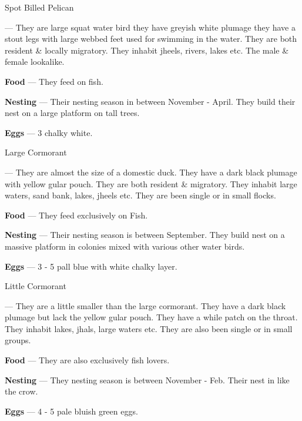 \begin{bird}{Spot Billed Pelican}

 --- They are large squat water bird they have greyish white plumage they have a stout legs with large webbed feet used for swimming in the water. They are both resident \& locally migratory. They inhabit jheels, rivers, lakes etc. The male \& female lookalike. 

{\large\bf Food} --- They feed on fish.

{\large\bf Nesting} --- Their nesting season in between November - April. They build their nest on a large platform on tall trees.

{\large\bf Eggs} --- 3 chalky white.
\end{bird}

\begin{bird}{Large Cormorant}

 --- They are almost the size of a domestic duck. They have a dark black plumage with yellow gular pouch. They are both resident \& migratory. They inhabit large waters, sand bank, lakes, jheels etc. They are been single or in small flocks.

{\large\bf Food} --- They feed exclusively on Fish.

{\large\bf Nesting} --- Their nesting season is between September. They build nest on a massive platform in colonies mixed with various other water birds. 

{\large\bf Eggs} --- 3 - 5 pall blue with white chalky layer. 
\end{bird}

\begin{bird}{Little Cormorant}

 --- They are a little smaller than the large cormorant. They have a dark black plumage but lack the yellow gular pouch. They have a while patch on the throat. They inhabit lakes, jhals, large waters etc. They are also been single or in small groups. 

{\large\bf Food} --- They are also exclusively fish lovers.

{\large\bf Nesting} --- They nesting season is between November - Feb. Their nest in like the crow. 

{\large\bf Eggs} --- 4 - 5 pale bluish green eggs.
\end{bird}

